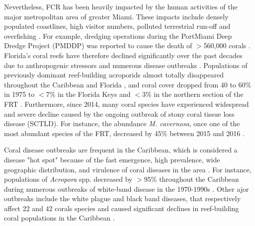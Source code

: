\documentclass[12pt ,a4paper]{article}
\begin{document}
Nevertheless, FCR has been heavily impacted by the human activities of the major metropolitan area of greater Miami. These impacts include densely populated coastlines, high visitor numbers, polluted terrestrial run-off and overfishing \citep{jackson2014status}. For example, dredging operations during the PortMiami Deep Dredge Project (PMDDP) was reported to cause the death of $>$560,000 corals \citep{cunning2019extensive}. Florida's coral reefs have therefore declined significantly over the past decades due to anthropogenic stressors and numerous disease outbreaks \citep{gardner2003long, jackson2014status}. Populations of previously dominant reef-building acroporids almost totally disappeared throughout the Caribbean and Florida \citep{aronson2001white}, and coral cover dropped from 40 to 60\% in 1975 to $<$7\% in the Florida Keys \citep{jackson2014status} and $<$3\% in the northern section of the FRT \citep{walton2018impacts}. Furthermore, since 2014, many coral species have experienced widespread and severe decline caused by the ongoing outbreak of stony coral tissue loss disease (SCTLD). For instance, the abundance \textit{M. cavernosa}, once one of the most abundant species of the FRT, decreased by 45\% between 2015 and 2016 \citep{walton2018impacts}.

Coral disease outbreaks are frequent in the Caribbean, which is considered a disease "hot spot" because of the fast emergence, high prevalence, wide geographic distribution, and virulence of coral diseases in the area \citep{green2000significance, harvell2007coral}. For instance, populations of  \textit{Acropora} spp. decreased by $>$95\% throughout the Caribbean during numerous outbreaks of white-band disease in the 1970-1990s \citep{aronson2001white}. Other ajor outbreaks include the white plague and black band diseases, that respectively affect 22 and 42 corals species and caused significant declines in reef-building coral populations in the Caribbean \citep{bruckner2003field,miller2009coral, muller2011black}. 
\end{document}
